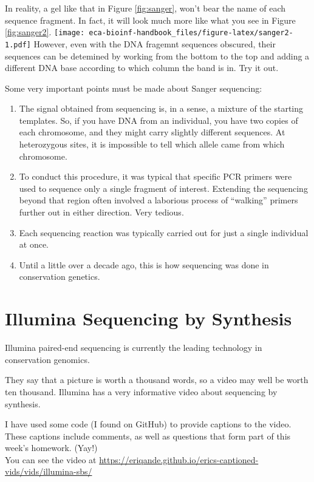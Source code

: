 \documentclass[]{krantz}
\providecommand{\tightlist}{%
  \setlength{\itemsep}{0pt}\setlength{\parskip}{0pt}}
\begin{document}
In reality, a gel like that in Figure \ref{fig:sanger}, won't bear the name of each
sequence fragment. In fact, it will look much more like what you see in Figure \ref{fig:sanger2}.
\texttt{[image: eca-bioinf-handbook\_files/figure-latex/sanger2-1.pdf]}
However, even with the DNA fragemnt sequences obscured, their sequences can be
detemined by working from the bottom to the top and adding a different DNA base according to which column the band is in. Try it out.

Some very important points must be made about Sanger sequencing:

\begin{enumerate}
\def\labelenumi{\arabic{enumi}.}
\tightlist
\item
  The signal obtained from sequencing is, in a sense, a mixture of the starting templates. So, if you
  have DNA from an individual, you have two copies of each chromosome, and they might carry slightly
  different sequences. At heterozygous sites, it is impossible to tell which allele came from which
  chromosome.
\item
  To conduct this procedure, it was typical that specific PCR primers were used to sequence
  only a single fragment of interest. Extending the sequencing beyond that region often involved
  a laborious process of ``walking'' primers further out in either direction. Very tedious.
\item
  Each sequencing reaction was typically carried out for just a single individual at once.\\
\item
  Until a little over a decade ago, this is how sequencing was done in conservation genetics.
\end{enumerate}

\hypertarget{illumina-sequencing-by-synthesis}{%
\section{Illumina Sequencing by Synthesis}\label{illumina-sequencing-by-synthesis}}

Illumina paired-end sequencing is currently the leading technology in conservation
genomics.

They say that a picture is worth a thousand words, so a video may well be worth
ten thousand. Illumina has a very informative video about sequencing by synthesis.

I have used some code (I found on GitHub) to provide captions to the video. These captions
include comments, as well as questions that form part of this week's homework. (Yay!)\\
You can see the video at
\url{https://eriqande.github.io/erics-captioned-vids/vids/illumina-sbs/}
\end{document}
